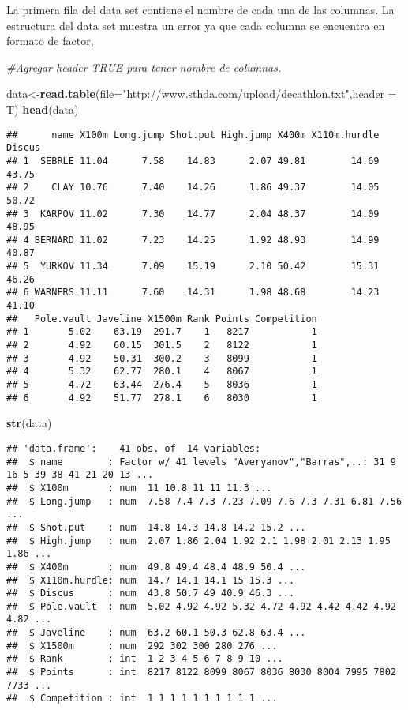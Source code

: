 \documentclass[]{article}
\newenvironment{Shaded}{\begin{snugshade}}{\end{snugshade}}
\newcommand{\KeywordTok}[1]{\textcolor[rgb]{0.13,0.29,0.53}{\textbf{#1}}}
\newcommand{\DataTypeTok}[1]{\textcolor[rgb]{0.13,0.29,0.53}{#1}}
\newcommand{\StringTok}[1]{\textcolor[rgb]{0.31,0.60,0.02}{#1}}
\newcommand{\CommentTok}[1]{\textcolor[rgb]{0.56,0.35,0.01}{\textit{#1}}}
\newcommand{\NormalTok}[1]{#1}
\begin{document}
La primera fila del data set contiene el nombre de cada una de las
columnas. La estructura del data set muestra un error ya que cada
columna se encuentra en formato de factor,

\begin{Shaded}
\begin{Highlighting}[]
\CommentTok{#Agregar header TRUE para tener nombre de columnas.}

\NormalTok{data<-}\KeywordTok{read.table}\NormalTok{(}\DataTypeTok{file=}\StringTok{"http://www.sthda.com/upload/decathlon.txt"}\NormalTok{,}\DataTypeTok{header =}\NormalTok{ T) }
\KeywordTok{head}\NormalTok{(data)}
\end{Highlighting}
\end{Shaded}

\begin{verbatim}
##      name X100m Long.jump Shot.put High.jump X400m X110m.hurdle Discus
## 1  SEBRLE 11.04      7.58    14.83      2.07 49.81        14.69  43.75
## 2    CLAY 10.76      7.40    14.26      1.86 49.37        14.05  50.72
## 3  KARPOV 11.02      7.30    14.77      2.04 48.37        14.09  48.95
## 4 BERNARD 11.02      7.23    14.25      1.92 48.93        14.99  40.87
## 5  YURKOV 11.34      7.09    15.19      2.10 50.42        15.31  46.26
## 6 WARNERS 11.11      7.60    14.31      1.98 48.68        14.23  41.10
##   Pole.vault Javeline X1500m Rank Points Competition
## 1       5.02    63.19  291.7    1   8217           1
## 2       4.92    60.15  301.5    2   8122           1
## 3       4.92    50.31  300.2    3   8099           1
## 4       5.32    62.77  280.1    4   8067           1
## 5       4.72    63.44  276.4    5   8036           1
## 6       4.92    51.77  278.1    6   8030           1
\end{verbatim}

\begin{Shaded}
\begin{Highlighting}[]
\KeywordTok{str}\NormalTok{(data)}
\end{Highlighting}
\end{Shaded}

\begin{verbatim}
## 'data.frame':    41 obs. of  14 variables:
##  $ name        : Factor w/ 41 levels "Averyanov","Barras",..: 31 9 16 5 39 38 41 21 20 13 ...
##  $ X100m       : num  11 10.8 11 11 11.3 ...
##  $ Long.jump   : num  7.58 7.4 7.3 7.23 7.09 7.6 7.3 7.31 6.81 7.56 ...
##  $ Shot.put    : num  14.8 14.3 14.8 14.2 15.2 ...
##  $ High.jump   : num  2.07 1.86 2.04 1.92 2.1 1.98 2.01 2.13 1.95 1.86 ...
##  $ X400m       : num  49.8 49.4 48.4 48.9 50.4 ...
##  $ X110m.hurdle: num  14.7 14.1 14.1 15 15.3 ...
##  $ Discus      : num  43.8 50.7 49 40.9 46.3 ...
##  $ Pole.vault  : num  5.02 4.92 4.92 5.32 4.72 4.92 4.42 4.42 4.92 4.82 ...
##  $ Javeline    : num  63.2 60.1 50.3 62.8 63.4 ...
##  $ X1500m      : num  292 302 300 280 276 ...
##  $ Rank        : int  1 2 3 4 5 6 7 8 9 10 ...
##  $ Points      : int  8217 8122 8099 8067 8036 8030 8004 7995 7802 7733 ...
##  $ Competition : int  1 1 1 1 1 1 1 1 1 1 ...
\end{verbatim}
\end{document}
